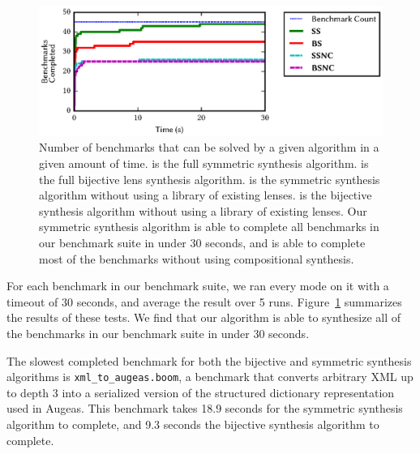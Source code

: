 \documentclass[acmsmall,screen,anonymous]{acmart}
\begin{document}
\begin{figure}
  \includegraphics{generated-graphs/times}
  \caption{ Number of benchmarks that can be solved by a given algorithm in a
    given amount of time. \SSOpt{} is the full symmetric synthesis algorithm.
    \BSOpt{} is the full bijective lens synthesis algorithm. \SSNCOpt{} is the
    symmetric synthesis algorithm without using a library of existing lenses.
    \BSNCOpt{} is the bijective synthesis algorithm without using a library of
    existing lenses. Our symmetric synthesis algorithm is able to complete all
    benchmarks in our benchmark suite in under 30 seconds, and is able to
    complete most of the benchmarks without using compositional
    synthesis. }
  \label{fig:times}
\end{figure}

For each benchmark in our benchmark suite, we ran every mode on it with a
timeout of 30 seconds, and average the result over 5 runs.
Figure~\ref{fig:times} summarizes the results of these tests. We find that our
algorithm is able to synthesize all of the benchmarks in our benchmark suite in
under 30 seconds.

The slowest completed benchmark for both the bijective and symmetric synthesis
algorithms is \texttt{xml\_to\_augeas.boom}, a benchmark that converts
arbitrary XML up to depth 3 into a serialized version of the structured
dictionary representation used in Augeas.  This benchmark takes 18.9 seconds for
the symmetric synthesis algorithm to complete, and 9.3 seconds the bijective
synthesis algorithm to complete.
\end{document}
